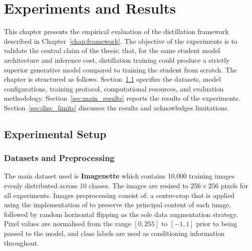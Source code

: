 
\chapter{Experiments and Results}
\label{chap:experiments}

This chapter presents the empirical evaluation of the distillation framework
described in Chapter~\ref{chap:framework}. The objective of the
experiments is to validate the central claim of the thesis: that,
for the same student model architecture and inference cost, distillation
training could produce a strictly superior generative model compared to training
the student from scratch. The chapter is structured as follows.
Section~\ref{sec:setup} specifies the datasets, model configurations, training
protocol, computational resources, and evaluation methodology.
Section~\ref{sec:main_results} reports the results of the experiments. Section~\ref{sec:disc_limits} discusses the results and acknowledges limitations.

\section{Experimental Setup}
\label{sec:setup}

\subsection*{Datasets and Preprocessing}
\label{subsec:datasets}

The main dataset used is \textbf{Imagenette} which contains 10{,}000 training images evenly distributed across 10 classes. The images are resized to $256 \times 256$ pixels for all experiments. Images preprocessing consist of: a centre-crop that is applied using the implementation of
\cite{dhariwal2021diffusion} to preserve the principal content of each image,
followed by random horizontal flipping as the sole data augmentation strategy.
Pixel values are normalised from the range $[0, 255]$ to $[-1, 1]$ prior to
being passed to the model, and class labels are used as conditioning
information throughout.

